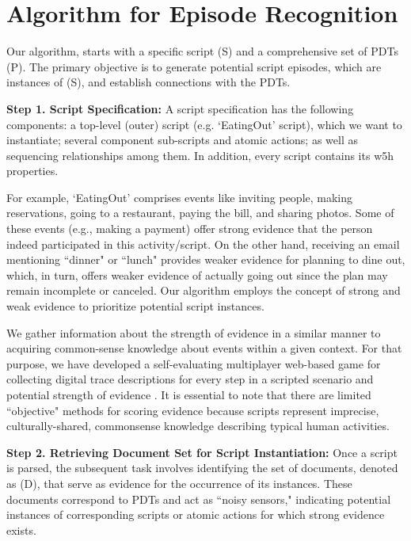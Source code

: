 \documentclass[11pt]{article}
\begin{document}
\section{Algorithm for Episode Recognition}
Our algorithm, starts with a specific script (S) and a comprehensive set of PDTs (P). The primary objective is to generate potential script episodes, which are instances of (S), and establish connections with the PDTs.

\textbf{Step 1. Script Specification:}
A script specification has the following components: a top-level (outer) script (e.g. `EatingOut' script), which we want
to instantiate; several component sub-scripts and atomic actions; as well as sequencing relationships among them. In addition, every script  contains its w5h properties. 

For example, `EatingOut' comprises  events like inviting people, making reservations, going to a restaurant, paying the bill, and sharing photos. Some of these events (e.g., making a payment) offer strong evidence that the person indeed participated in this activity/script. On the other hand, receiving an email mentioning ``dinner" or ``lunch" provides weaker evidence for planning to dine out, which, in turn, offers weaker evidence of actually going out since the plan may remain incomplete or canceled. Our algorithm employs the concept of strong and weak evidence to prioritize potential script instances.

We gather information about the strength of evidence in a similar manner to acquiring common-sense knowledge about events within a given context. For that purpose, we have developed a self-evaluating multiplayer web-based game for collecting digital trace descriptions for every step in a scripted scenario and potential strength of evidence \cite{kalokyri2023one}. It is essential to note that there are limited ``objective" methods for scoring evidence because scripts represent imprecise, culturally-shared, commonsense knowledge describing typical human activities.

\textbf{Step 2. Retrieving Document Set for Script Instantiation:}
Once a script is parsed, the subsequent task involves identifying the set of documents, denoted as (D), that serve as evidence for the occurrence of its instances. These documents correspond to PDTs and act as ``noisy sensors," indicating potential instances of corresponding scripts or atomic actions for which strong evidence exists.
\end{document}

